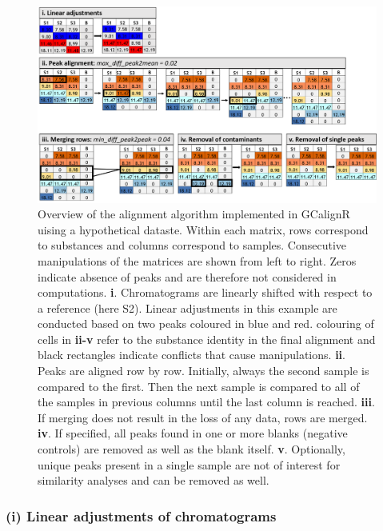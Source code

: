 \begin{figure}[htbp]
\includegraphics[width=13cm]{figures/algorithm_representation}
\caption{Overview of the alignment algorithm implemented in GCalignR uising a hypothetical dataste. Within each matrix, rows correspond to substances and columns correspond to samples. Consecutive manipulations of the matrices are shown from left to right. Zeros indicate absence of peaks and are therefore not considered in computations. \textbf{i}. Chromatograms are linearly shifted with respect to a reference (here S2). Linear adjustments in this example are conducted based on two peaks coloured in blue and red.  colouring of cells in \textbf{ii-v} refer to the substance identity in the final alignment and black rectangles indicate conflicts that cause manipulations. \textbf{ii}. Peaks are aligned row by row. Initially, always the second sample is compared to the first. Then the next sample is compared to all of the samples in previous columns until the last column is reached. \textbf{iii}. If merging does not result in the loss of any data, rows are merged. \textbf{iv}. If specified, all peaks found in one or more blanks (negative controls) are removed as well as the blank itself. \textbf{v}. Optionally, unique peaks present in a single sample are not of interest for similarity analyses and can be removed as well.}
\label{figure:algorithm}
\end{figure}

\subsubsection{(i) Linear adjustments of
chromatograms}\label{i-linear-adjustments-of-chromatograms}

